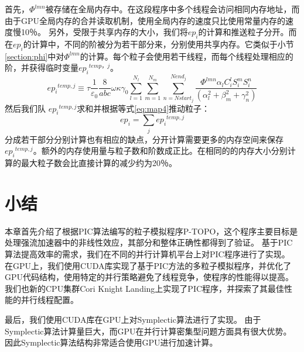 首先，$\Phi^{lmn}$被存储在全局内存中。在这段程序中多个线程会访问相同内存地址，而由于GPU全局内存的合并读取机制，使用全局内存的速度只比使用常量内存的速度慢10％。
另外，受限于共享内存的大小，我们将$ ep_{i} $的计算和推送粒子分开。而在$ ep_{i} $的计算中，不同的阶被分为若干部分来，分别使用共享内存。它类似于小节 \ref{section:phi}中对$\Phi^{lmn}$的计算。每个粒子会使用若干线程，而每个线程处理相应的阶，并获得临时变量${e{{p}_{i}}^{temp，j}}$。
\begin{equation}
{e{{p}_{i}}^{temp,j}}\equiv \tau \frac{1}{{{\varepsilon }_{0}}}\frac{8}{abc}\omega \kappa {{\gamma }_{0}}\sum\limits_{l=1}^{{{N}_{l}}}{\sum\limits_{m=1}^{{{N}_{m}}}{\sum\limits_{n=Nstar{{t}_{j}}}^{Nen{{d}_{j}}}{\frac{\Phi^{lmn}{{\alpha }_{l}}C_{i}^{l}S_{i}^{m}S_{i}^{n}}{(\alpha _{l}^{2}+\beta _{m}^{2}+\gamma _{n}^{2})}}}}
\end{equation}
然后我们队 ${e{{p}_{i}}^{temp,j}}$求和并根据等式\ref{eq:map4}推动粒子：
\begin{equation}
e{{p}_{i}}=\sum\limits_{j}{e{{p}_{i}}^{temp,j}}
\end{equation}
分成若干部分分别计算也有相应的缺点，分开计算需要更多的内存空间来保存~${e{{p}_{i}}^{temp,j}}$。额外的内存使用量与粒子数和阶数成正比。在相同的的内存大小分别计算的最大粒子数会比直接计算的减少约为20％。

\section{小结}                            \label{section:Code_conclusion}
本章首先介绍了根据PIC算法编写的粒子模拟程序P-TOPO，这个程序主要目标是处理强流加速器中的非线性效应，其部分和整体正确性都得到了验证。
基于PIC算法提高效率的需求，我们在不同的并行计算机平台上对PIC程序进行了实现。
在GPU上，我们使用CUDA库实现了基于PIC方法的多粒子模拟程序，并优化了GPU代码结构，使用特定的并行策略避免了线程竞争，使程序的性能得以提高。
我们也新的CPU集群Cori Knight Landing上实现了PIC程序，并探索了其最佳性能的并行线程配置。

最后，我们使用CUDA库在GPU上对Symplectic算法进行了实现。
由于Symplectic算法计算量巨大，而GPU在并行计算密集型问题方面具有很大优势。
因此Symplectic算法结构非常适合使用GPU进行加速计算。